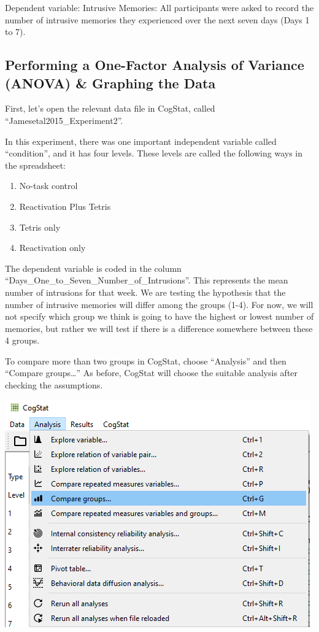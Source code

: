 \documentclass[
]{book}
\begin{document}
Dependent variable: Intrusive Memories: All participants were asked to record the number of intrusive memories they experienced over the next seven days (Days 1 to 7).

\hypertarget{performing-a-one-factor-analysis-of-variance-anova-graphing-the-data-1}{%
\subsection{Performing a One-Factor Analysis of Variance (ANOVA) \& Graphing the Data}\label{performing-a-one-factor-analysis-of-variance-anova-graphing-the-data-1}}

First, let's open the relevant data file in CogStat, called ``Jamesetal2015\_Experiment2''.

In this experiment, there was one important independent variable called ``condition'', and it has four levels. These levels are called the following ways in the spreadsheet:

\begin{enumerate}
\def\labelenumi{\arabic{enumi}.}
\item
  No-task control
\item
  Reactivation Plus Tetris
\item
  Tetris only
\item
  Reactivation only
\end{enumerate}

The dependent variable is coded in the column ``Days\_One\_to\_Seven\_Number\_of\_Intrusions''. This represents the mean number of intrusions for that week. We are testing the hypothesis that the number of intrusive memories will differ among the groups (1-4). For now, we will not specify which group we think is going to have the highest or lowest number of memories, but rather we will test if there is a difference somewhere between these 4 groups.

To compare more than two groups in CogStat, choose ``Analysis'' and then ``Compare groups\ldots{}'' As before, CogStat will choose the suitable analysis after checking the assumptions.

\includegraphics{img/ch8/8.3comparegroups_menu.png}
\end{document}
